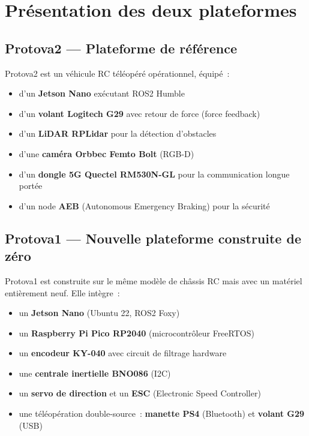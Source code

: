 \documentclass[a4paper,11pt]{article}
\begin{document}
\section{Présentation des deux plateformes}

\subsection{Protova2 — Plateforme de référence}

Protova2 est un véhicule RC téléopéré opérationnel, équipé~:
\begin{itemize}[noitemsep]
  \item d'un \textbf{Jetson Nano} exécutant ROS2 Humble
  \item d'un \textbf{volant Logitech G29} avec retour de force (force feedback)
  \item d'un \textbf{LiDAR RPLidar} pour la détection d'obstacles
  \item d'une \textbf{caméra Orbbec Femto Bolt} (RGB-D)
  \item d'un \textbf{dongle 5G Quectel RM530N-GL} pour la communication longue portée
  \item d'un node \textbf{AEB} (Autonomous Emergency Braking) pour la sécurité
\end{itemize}

\subsection{Protova1 — Nouvelle plateforme construite de zéro}

Protova1 est construite sur le même modèle de châssis RC mais avec un matériel
entièrement neuf. Elle intègre~:
\begin{itemize}[noitemsep]
  \item un \textbf{Jetson Nano} (Ubuntu 22, ROS2 Foxy)
  \item un \textbf{Raspberry Pi Pico RP2040} (microcontrôleur FreeRTOS)
  \item un \textbf{encodeur KY-040} avec circuit de filtrage hardware
  \item une \textbf{centrale inertielle BNO086} (I2C)
  \item un \textbf{servo de direction} et un \textbf{ESC} (Electronic Speed Controller)
  \item une téléopération double-source~: \textbf{manette PS4} (Bluetooth) et
        \textbf{volant G29} (USB)
\end{itemize}
\end{document}
